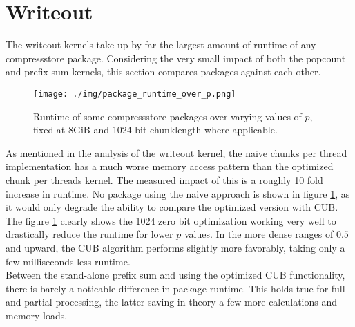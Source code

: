 \documentclass{tudscrreprt}
\begin{document}
		\section{Writeout}
			The writeout kernels take up by far the largest amount of runtime of any compressstore package. Considering the very small impact of both the popcount and prefix sum kernels, this section compares packages against each other.
		
			\begin{figure}[!ht]
				\centering
				\texttt{[image: ./img/package\_runtime\_over\_p.png]}
				\caption{\label{fig:package_runtime_over_p}Runtime of some compressstore packages over varying values of $p$, fixed at 8GiB and 1024 bit chunklength where applicable.}
			\end{figure}
			
			As mentioned in the analysis of the writeout kernel, the naive chunks per thread implementation has a much worse memory access pattern than the optimized chunk per threads kernel. The measured impact of this is a roughly 10 fold increase in runtime. No package using the naive approach is shown in figure \ref{fig:package_runtime_over_p}, as it would only degrade the ability to compare the optimized version with CUB. \\
			
			The figure \ref{fig:package_runtime_over_p} clearly shows the 1024 zero bit optimization working very well to drastically reduce the runtime for lower $p$ values. In the more dense ranges of $0.5$ and upward, the CUB algorithm performs slightly more favorably, taking only a few milliseconds less runtime. \\
			
			Between the stand-alone prefix sum and using the optimized CUB functionality, there is barely a noticable difference in package runtime. This holds true for full and partial processing, the latter saving in theory a few more calculations and memory loads. \\
			
\end{document}
